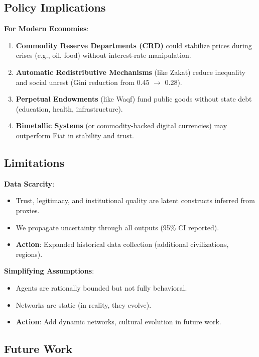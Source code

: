 \documentclass[12pt,a4paper]{article}
\begin{document}
\subsection{Policy Implications}

\textbf{For Modern Economies}:
\begin{enumerate}
    \item \textbf{Commodity Reserve Departments (CRD)} could stabilize prices during crises (e.g., oil, food) without interest-rate manipulation.
    \item \textbf{Automatic Redistributive Mechanisms} (like Zakat) reduce inequality and social unrest (Gini reduction from 0.45 $\rightarrow$ 0.28).
    \item \textbf{Perpetual Endowments} (like Waqf) fund public goods without state debt (education, health, infrastructure).
    \item \textbf{Bimetallic Systems} (or commodity-backed digital currencies) may outperform Fiat in stability and trust.
\end{enumerate}

\subsection{Limitations}

\textbf{Data Scarcity}:
\begin{itemize}
    \item Trust, legitimacy, and institutional quality are latent constructs inferred from proxies.
    \item We propagate uncertainty through all outputs (95\% CI reported).
    \item \textbf{Action}: Expanded historical data collection (additional civilizations, regions).
\end{itemize}

\textbf{Simplifying Assumptions}:
\begin{itemize}
    \item Agents are rationally bounded but not fully behavioral.
    \item Networks are static (in reality, they evolve).
    \item \textbf{Action}: Add dynamic networks, cultural evolution in future work.
\end{itemize}

\subsection{Future Work}
\end{document}
